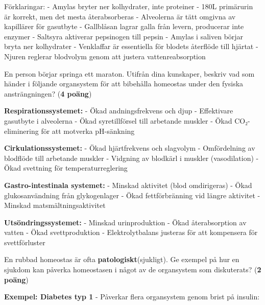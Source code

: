 \documentclass{exam}
\begin{document}
\begin{questions}
\begin{solution}
Förklaringar:
- Amylas bryter ner kolhydrater, inte proteiner
- 180L primärurin är korrekt, men det mesta återabsorberas
- Alveolerna är tätt omgivna av kapillärer för gasutbyte
- Gallblåsan lagrar galla från levern, producerar inte enzymer
- Saltsyra aktiverar pepsinogen till pepsin
- Amylas i saliven börjar bryta ner kolhydrater
- Venklaffar är essentiella för blodets återflöde till hjärtat
- Njuren reglerar blodvolym genom att justera vattenreabsorption
\end{solution}

\break

\vspace{5mm}
\begin{center}
\end{center}

\question
En person börjar springa ett maraton. Utifrån dina kunskaper, beskriv vad som händer i följande organsystem för att bibehålla homeostas under den fysiska ansträngningen? (\textbf{4 poäng})

\begin{solution}
\textbf{Respirationssystemet:}
- Ökad andningsfrekvens och djup
- Effektivare gasutbyte i alveolerna
- Ökad syretillförsel till arbetande muskler
- Ökad CO₂-eliminering för att motverka pH-sänkning

\textbf{Cirkulationssystemet:}
- Ökad hjärtfrekvens och slagvolym
- Omfördelning av blodflöde till arbetande muskler
- Vidgning av blodkärl i muskler (vasodilation)
- Ökad svettning för temperaturreglering

\textbf{Gastro-intestinala systemet:}
- Minskad aktivitet (blod omdirigeras)
- Ökad glukosanvändning från glykogenlager
- Ökad fettförbränning vid längre aktivitet
- Minskad matsmältningsaktivitet

\textbf{Utsöndringssystemet:}
- Minskad urinproduktion
- Ökad återabsorption av vatten
- Ökad svettproduktion
- Elektrolytbalans justeras för att kompensera för svettförluster
\end{solution}

\question
En rubbad homeostas är ofta \textbf{patologiskt}(sjukligt). Ge exempel på hur en sjukdom kan påverka homeostasen i något av de organsystem som diskuterats? (\textbf{2 poäng})

\begin{solution}
\textbf{Exempel: Diabetes typ 1}
- Påverkar flera organsystem genom brist på insulin:


\end{solution}
\end{questions}
\end{document}
